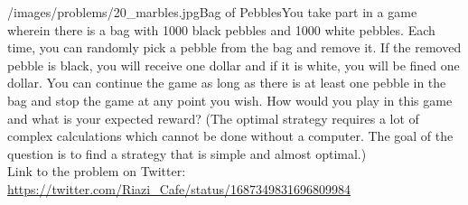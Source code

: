 \begin{problem}{/images/problems/20_marbles.jpg}{Bag of Pebbles}You take part in a game wherein there is a bag with 1000 black pebbles and 1000 white pebbles. Each time, you can randomly pick a pebble from the bag and remove it. If the removed pebble is black, you will receive one dollar and if it is white, you will be fined one dollar. You can continue the game as long as there is at least one pebble in the bag and stop the game at any point you wish. How would you play in this game and what is your expected reward? (The optimal strategy requires a lot of complex calculations which cannot be done without a computer. The goal of the question is to find a strategy that is simple and almost optimal.)\\[0.2cm]

Link to the problem on Twitter:  \url{https://twitter.com/Riazi_Cafe/status/1687349831696809984}\end{problem}
